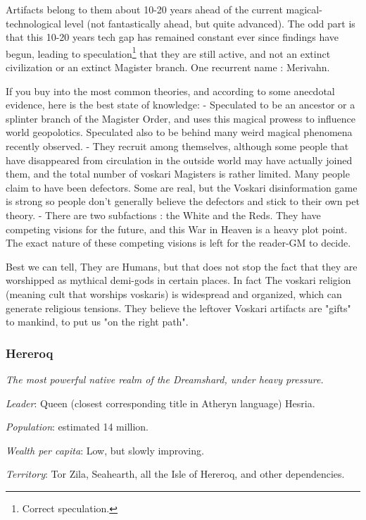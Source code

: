 Artifacts belong to them about 10-20 years ahead of the current magical-technological level (not fantastically ahead, but quite advanced). The odd part is that this 10-20 years tech gap has remained constant ever since findings have begun, leading to speculation\footnote{Correct speculation.} that they are still active, and not an extinct civilization or an extinct Magister branch. One recurrent name : Merivahn.


If you buy into the most common theories, and according to some anecdotal evidence, here is the best state of knowledge: 
    - Speculated to be an ancestor or a splinter branch of the Magister Order, and uses this magical prowess to influence world geopolotics. Speculated also to be behind many weird magical phenomena recently observed.
    - They recruit among themselves, although some people that have disappeared from circulation in the outside world may have actually joined them, and the total number of voskari Magisters is rather limited. Many people claim to have been defectors. Some are real, but the Voskari disinformation game is strong so people don't generally believe the defectors and stick to their own pet theory.
    - There are two subfactions : the White and the Reds. They have competing visions for the future, and this War in Heaven is a heavy plot point. The exact nature of these competing visions is left for the reader-GM to decide.

Best we can tell, They are Humans, but that does not stop the fact that they are worshipped as mythical demi-gods in certain places. In fact The voskari religion (meaning cult that worships voskaris) is widespread and organized, which can generate religious tensions. They believe the leftover Voskari artifacts are "gifts" to mankind, to put us "on the right path". 


\subsubsection{Hereroq}

\textit{The most powerful native realm of the Dreamshard, under heavy pressure.}

\textit{Leader}: Queen (closest corresponding title in Atheryn language) Hesria.

\textit{Population}: estimated 14 million.

\textit{Wealth per capita}: Low, but slowly improving.

\textit{Territory}: Tor Zila, Seahearth, all the Isle of Hereroq, and other dependencies.
    
